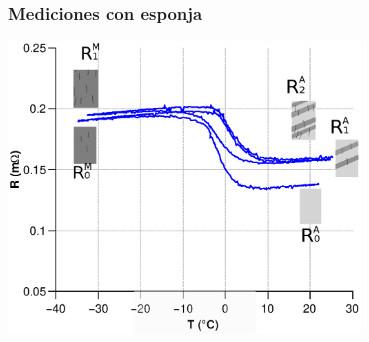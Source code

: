 \documentclass[usenames,dvipsnames]{beamer}
\begin{document}








\begin{frame}

\frametitle{Mediciones con esponja}

\begin{center}
\includegraphics[width=0.7\textwidth]{img/resistencia/Histeresis2.eps}
\end{center}

\end{frame}
\end{document}
